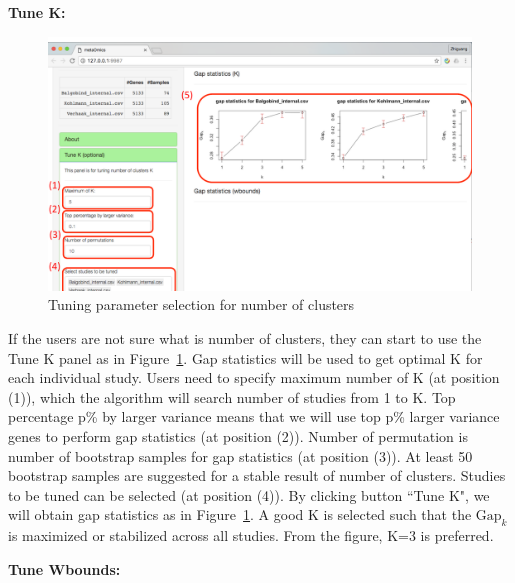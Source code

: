 \begin{steps}

\item \textbf{Tune K:} 

\begin{figure}[H]
\begin{center}
\includegraphics[scale=0.4]{./figure/metaClust/tuneK}
\caption{Tuning parameter selection for number of clusters}
\label{fig:metaClusttuneK}
\end{center}
\end{figure}

If the users are not sure what is number of clusters,
they can start to use the Tune K panel as in Figure~\ref{fig:metaClusttuneK}.
Gap statistics will be used to get optimal K for each individual study.
Users need to specify maximum number of K (at position {\color{red} (1)}), which the algorithm will search number of studies from 1 to K.
Top percentage p\% by larger variance means that we will use top p\% larger variance genes to perform gap statistics (at position {\color{red} (2)}).
Number of permutation is number of bootstrap samples for gap statistics (at position {\color{red} (3)}).
At least 50 bootstrap samples are suggested for a stable result of number of clusters.
Studies to be tuned can be selected (at position {\color{red} (4)}).
By clicking button ``Tune K",
we will obtain gap statistics as in Figure~\ref{fig:metaClusttuneK}.
A good K is selected such that the $\mbox{Gap}_k$ is maximized or stabilized across all studies.
From the figure, K=3 is preferred.

\item \textbf{Tune Wbounds:} 


\end{steps}
